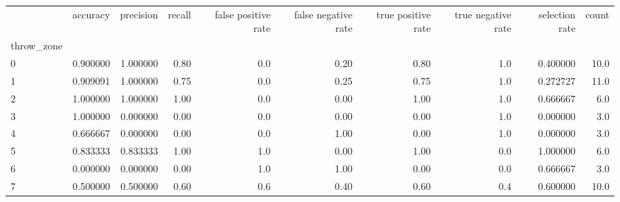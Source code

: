 \begin{tabular}{lrrrrrrrrr}
\toprule
{} &  accuracy &  precision &  recall &  false positive rate &  false negative rate &  true positive rate &  true negative rate &  selection rate &  count \\
throw\_zone &           &            &         &                      &                      &                     &                     &                 &        \\
\midrule
0          &  0.900000 &   1.000000 &    0.80 &                  0.0 &                 0.20 &                0.80 &                 1.0 &        0.400000 &   10.0 \\
1          &  0.909091 &   1.000000 &    0.75 &                  0.0 &                 0.25 &                0.75 &                 1.0 &        0.272727 &   11.0 \\
2          &  1.000000 &   1.000000 &    1.00 &                  0.0 &                 0.00 &                1.00 &                 1.0 &        0.666667 &    6.0 \\
3          &  1.000000 &   0.000000 &    0.00 &                  0.0 &                 0.00 &                0.00 &                 1.0 &        0.000000 &    3.0 \\
4          &  0.666667 &   0.000000 &    0.00 &                  0.0 &                 1.00 &                0.00 &                 1.0 &        0.000000 &    3.0 \\
5          &  0.833333 &   0.833333 &    1.00 &                  1.0 &                 0.00 &                1.00 &                 0.0 &        1.000000 &    6.0 \\
6          &  0.000000 &   0.000000 &    0.00 &                  1.0 &                 1.00 &                0.00 &                 0.0 &        0.666667 &    3.0 \\
7          &  0.500000 &   0.500000 &    0.60 &                  0.6 &                 0.40 &                0.60 &                 0.4 &        0.600000 &   10.0 \\
\bottomrule
\end{tabular}
